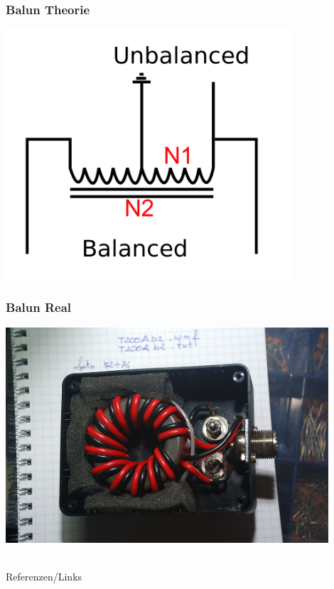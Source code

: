 \begin{frame}
    \frametitle{Balun Theorie}
	\begin{center}
        \includegraphics[width=0.8\textwidth]{a03/Cdbalun2.png}
                \tiny \hyperlink{refs}{\cite{wc}}
    \end{center}
\end{frame}

\begin{frame}
    \frametitle{Balun Real}
	\begin{center}
        \includegraphics[width=0.9\textwidth]{a03/balun-Real.jpg}
                \tiny \hyperlink{refs}{\cite{wc}}
    \end{center}
\end{frame}


\renewcommand{\refname}{Referenzen}

\hypertarget{refs}{}
\textcolor{white}{} \\ %
\Large Referenzen/Links
\footnotesize

